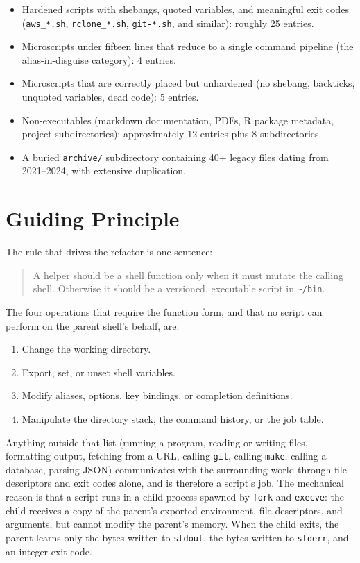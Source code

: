 \documentclass[11pt,letterpaper]{scrartcl}
\begin{document}
\begin{itemize}
  \item Hardened scripts with shebangs, quoted variables, and
        meaningful exit codes (\texttt{aws\_*.sh},
        \texttt{rclone\_*.sh}, \texttt{git-*.sh}, and similar):
        roughly 25 entries.
  \item Microscripts under fifteen lines that reduce to a single
        command pipeline (the alias-in-disguise category):
        4 entries.
  \item Microscripts that are correctly placed but unhardened (no
        shebang, backticks, unquoted variables, dead code):
        5 entries.
  \item Non-executables (markdown documentation, PDFs, R package
        metadata, project subdirectories): approximately 12 entries
        plus 8 subdirectories.
  \item A buried \texttt{archive/} subdirectory containing 40+
        legacy files dating from 2021--2024, with extensive
        duplication.
\end{itemize}

\section{Guiding Principle}

The rule that drives the refactor is one sentence:

\begin{quote}
A helper should be a shell function only when it must mutate the
calling shell. Otherwise it should be a versioned, executable script
in \texttt{\textasciitilde/bin}.
\end{quote}

The four operations that require the function form, and that no
script can perform on the parent shell's behalf, are:

\begin{enumerate}
  \item Change the working directory.
  \item Export, set, or unset shell variables.
  \item Modify aliases, options, key bindings, or completion
        definitions.
  \item Manipulate the directory stack, the command history, or the
        job table.
\end{enumerate}

Anything outside that list (running a program, reading or writing
files, formatting output, fetching from a URL, calling
\texttt{git}, calling \texttt{make}, calling a database, parsing
JSON) communicates with the surrounding world through file
descriptors and exit codes alone, and is therefore a script's job.
The mechanical reason is that a script runs in a child process
spawned by \texttt{fork} and \texttt{execve}: the child receives a
copy of the parent's exported environment, file descriptors, and
arguments, but cannot modify the parent's memory. When the child
exits, the parent learns only the bytes written to \texttt{stdout},
the bytes written to \texttt{stderr}, and an integer exit code.
\end{document}
